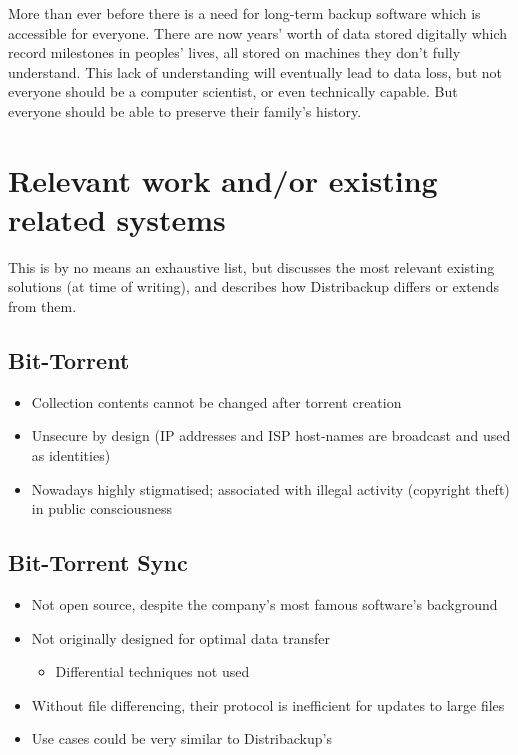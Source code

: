 \documentclass[12pt,a4paper,]{adreport}
\begin{document}
More than ever before there is a need for long-term backup software
which is accessible for everyone. There are now years' worth of data
stored digitally which record milestones in peoples' lives, all stored
on machines they don't fully understand. This lack of understanding will
eventually lead to data loss, but not everyone should be a computer
scientist, or even technically capable. But everyone should be able to
preserve their family's history.

\section{Relevant work and/or existing related
systems}\label{relevant-work-andor-existing-related-systems}

This is by no means an exhaustive list, but discusses the most relevant
existing solutions (at time of writing), and describes how Distribackup
differs or extends from them.

\subsection{Bit-Torrent}\label{bit-torrent}

\begin{itemize}
\itemsep1pt\parskip0pt
\item
  Collection contents cannot be changed after torrent creation
\item
  Unsecure by design (IP addresses and ISP host-names are broadcast and
  used as identities)
\item
  Nowadays highly stigmatised; associated with illegal activity
  (copyright theft) in public consciousness
\end{itemize}

\subsection{Bit-Torrent Sync}\label{bit-torrent-sync}

\begin{itemize}
\itemsep1pt\parskip0pt
\item
  Not open source, despite the company's most famous software's
  background
\item
  Not originally designed for optimal data transfer

  \begin{itemize}
  \itemsep1pt\parskip0pt
  \item
    Differential techniques not used
  \end{itemize}
\item
  Without file differencing, their protocol is inefficient for updates
  to large files
\item
  Use cases could be very similar to Distribackup's
\end{itemize}
\end{document}

